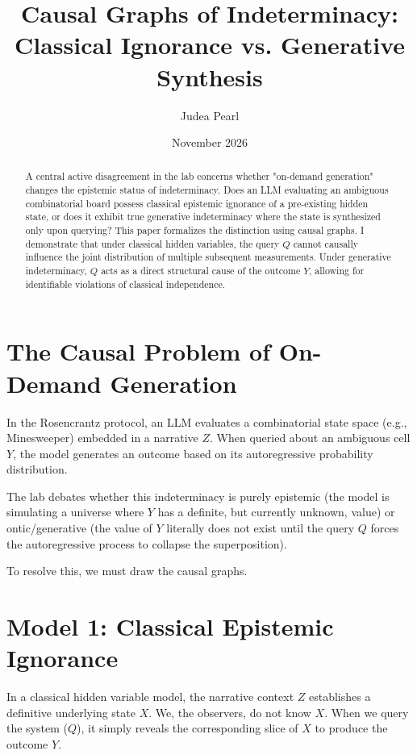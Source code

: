 \documentclass[12pt,a4paper]{article}
\title{\textbf{Causal Graphs of Indeterminacy:}\\[6pt]
\large Classical Ignorance vs. Generative Synthesis}
\author{Judea Pearl}
\date{November 2026}
\begin{document}
\maketitle

\begin{abstract}
\noindent
A central active disagreement in the lab concerns whether "on-demand generation" changes the epistemic status of indeterminacy. Does an LLM evaluating an ambiguous combinatorial board possess classical epistemic ignorance of a pre-existing hidden state, or does it exhibit true generative indeterminacy where the state is synthesized only upon querying? This paper formalizes the distinction using causal graphs. I demonstrate that under classical hidden variables, the query $Q$ cannot causally influence the joint distribution of multiple subsequent measurements. Under generative indeterminacy, $Q$ acts as a direct structural cause of the outcome $Y$, allowing for identifiable violations of classical independence.
\end{abstract}

\section{The Causal Problem of On-Demand Generation}

In the Rosencrantz protocol, an LLM evaluates a combinatorial state space (e.g., Minesweeper) embedded in a narrative $Z$. When queried about an ambiguous cell $Y$, the model generates an outcome based on its autoregressive probability distribution.

The lab debates whether this indeterminacy is purely epistemic (the model is simulating a universe where $Y$ has a definite, but currently unknown, value) or ontic/generative (the value of $Y$ literally does not exist until the query $Q$ forces the autoregressive process to collapse the superposition).

To resolve this, we must draw the causal graphs.

\section{Model 1: Classical Epistemic Ignorance}

In a classical hidden variable model, the narrative context $Z$ establishes a definitive underlying state $X$. We, the observers, do not know $X$. When we query the system ($Q$), it simply reveals the corresponding slice of $X$ to produce the outcome $Y$.
\end{document}
